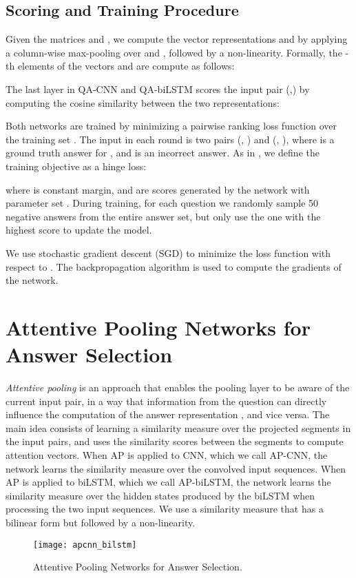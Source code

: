\documentclass{article}
\begin{document}
\subsection{Scoring and Training Procedure}
Given the matrices  and , 
we compute the vector representations  and  by applying a column-wise max-pooling over  and , 
followed by a non-linearity.
Formally, 
the -th elements of the vectors  and  are compute as follows:



The last layer in QA-CNN and QA-biLSTM scores the input pair (,) by  computing the cosine similarity between the two representations:


Both networks are trained by minimizing a pairwise ranking loss function over the training set .
The input in each round is two pairs (, ) and (, ),
where  is a ground truth answer for ,
and  is an incorrect answer.
As in \cite{weston2014,hu2014}, 
we define the training objective as a hinge loss:

where  is constant margin,
 and 
are scores generated by the network with parameter set .
During training,
for each question we randomly sample 50 negative answers from the entire answer set,
but only use the one with the highest score to update the model.

We use stochastic gradient descent (SGD) to minimize the
loss function with respect to . 
The backpropagation algorithm is used to compute the gradients of the network. \section{Attentive Pooling Networks for Answer Selection}
\label{ap_networks}
\emph{Attentive pooling} is an approach that enables the pooling layer to be aware of the current input pair, 
in a way that information from the question  can directly influence the computation of the answer representation , 
and vice versa.
The main idea consists of learning a similarity measure over the projected segments in the input pairs,
and uses the similarity scores between the segments to compute attention vectors.
When AP is applied to CNN,
which we call AP-CNN,
the network learns the similarity measure over the convolved input sequences.
When AP is applied to biLSTM,
which we call AP-biLSTM,
the network learns the similarity measure over the hidden states produced by the biLSTM when processing the two input sequences.
We use a similarity measure that has a bilinear form but followed by a non-linearity.

\begin{figure*}[ht]
\vskip 0.2in
\begin{center}
\centerline{\texttt{[image: apcnn\_bilstm]}}
\caption{Attentive Pooling Networks for Answer Selection.}
\label{apcnn}
\end{center}
\vskip -0.2in
\end{figure*}
\end{document}
